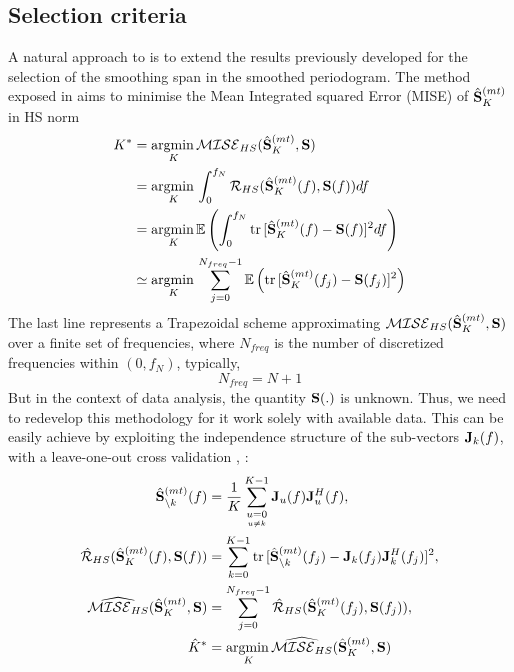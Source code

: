 \documentclass[9pt,journal]{IEEEtran}
\numberwithin{equation}{section}
\newcommand\tr{\normalfont \text{tr}\,}
\newcommand\argmin{\normalfont \mbox{argmin}\,}
\newcommand\fnyq{f_N}
\begin{document}
\subsection*{Selection criteria}
A natural approach to is to extend the results previously developed for the selection of the smoothing span in the smoothed periodogram. The method exposed in \cite{C.M.Lee2001} aims to minimise the Mean Integrated squared Error (MISE) of $\hat{\bold S}^{(mt)}_K$ in HS norm
\begin{align*}
K^* &= \underset{K}{\argmin} \mathcal{MISE}_{HS}(\hat{\bold S}^{(mt)}_K,\bold S)\\
&= \underset{K}{\argmin} \int^{\fnyq}_0 \mathcal{R}_{HS}(\hat{\bold S}^{(mt)}_K(f),\bold S(f))df\\
&= \underset{K}{\argmin} \mathbb{E}\left(\int^{\fnyq}_0 \tr[\hat{\bold S}^{(mt)}_K(f)-\bold S(f)]^2 df\right) \\
&\simeq \underset{K}{\argmin} \sum^{N_{freq}-1}_{j=0}\mathbb{E}\left( \tr[\hat{\bold S}^{(mt)}_K(f_j)-\bold S(f_j)]^2 \right)
\end{align*}
The last line represents a Trapezoidal scheme approximating $\mathcal{MISE}_{HS}(\hat{\bold S}^{(mt)}_K,\bold S)$ over a finite set of frequencies, where $N_{freq}$ is the number of discretized frequencies within $(0,\fnyq)$, typically,
\begin{equation*}
N_{freq} = N+1 
\end{equation*}
But in the context of data analysis, the quantity $\bold S(.)$  is unknown. Thus, we need to redevelop this methodology for it work solely with available data. This can be easily achieve by exploiting the independence structure of the sub-vectors $\bold J_k(f)$, with a leave-one-out cross validation \cite{Walden}, \cite{Fiecas2011}:
\begin{align}
\hat{\bold S}^{(mt)}_{\backslash k}(f) &=  \frac{1}{K} \sum^{K-1}_{\underset{u\neq k}{u=0}}\bold J_u(f)\bold J^H_u(f), \nonumber\\
\hat{\mathcal{R}}_{HS}(\hat{\bold S}^{(mt)}_K(f),\bold S(f)) &=\sum^{K-1}_{k=0} \tr[\hat{\bold S}^{(mt)}_{\backslash k}(f_j)-\bold J_k(f_j)\bold J^H_k(f_j)]^2, \nonumber\\
\widehat{\mathcal{MISE}_{HS}}(\hat{\bold S}^{(mt)}_K,\bold S) &= \sum^{N_{freq}-1}_{j=0} \hat{\mathcal{R}}_{HS}(\hat{\bold S}^{(mt)}_K(f_j),\bold S(f_j)), \nonumber \\
\hat{K}^* &= \underset{K}{\argmin} \widehat{\mathcal{MISE}_{HS}}(\hat{\bold S}^{(mt)}_K,\bold S) \label{eq:procedure1}
\end{align}
\end{document}
